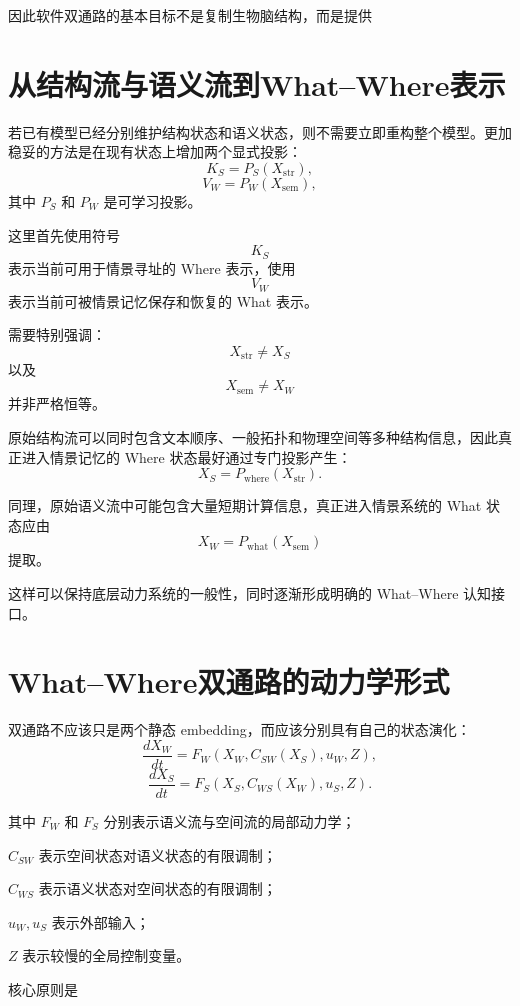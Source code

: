 因此软件双通路的基本目标不是复制生物脑结构，而是提供
\begin{statementbox}
\centering
{}
\end{statementbox}

\section{从结构流与语义流到What--Where表示}

若已有模型已经分别维护结构状态和语义状态，则不需要立即重构整个模型。更加稳妥的方法是在现有状态上增加两个显式投影：
\[
K_S
=
P_S(X_{\mathrm{str}}),
\]
\[
V_W
=
P_W(X_{\mathrm{sem}}),
\]
其中 $P_S$ 和 $P_W$ 是可学习投影。

这里首先使用符号
\[
K_S
\]
表示当前可用于情景寻址的 Where 表示，使用
\[
V_W
\]
表示当前可被情景记忆保存和恢复的 What 表示。

需要特别强调：
\[
\boxed{
X_{\mathrm{str}}
\neq
X_S
}
\]
以及
\[
\boxed{
X_{\mathrm{sem}}
\neq
X_W
}
\]
并非严格恒等。

原始结构流可以同时包含文本顺序、一般拓扑和物理空间等多种结构信息，因此真正进入情景记忆的 Where 状态最好通过专门投影产生：
\[
X_S
=
P_{\mathrm{where}}(X_{\mathrm{str}}).
\]

同理，原始语义流中可能包含大量短期计算信息，真正进入情景系统的 What 状态应由
\[
X_W
=
P_{\mathrm{what}}(X_{\mathrm{sem}})
\]
提取。

这样可以保持底层动力系统的一般性，同时逐渐形成明确的 What--Where 认知接口。

\section{What--Where双通路的动力学形式}

双通路不应该只是两个静态 embedding，而应该分别具有自己的状态演化：
\[
\frac{dX_W}{dt}
=
F_W
\left(
X_W,
C_{SW}(X_S),
u_W,
Z
\right),
\]
\[
\frac{dX_S}{dt}
=
F_S
\left(
X_S,
C_{WS}(X_W),
u_S,
Z
\right).
\]

其中 $F_W$ 和 $F_S$ 分别表示语义流与空间流的局部动力学；

$C_{SW}$ 表示空间状态对语义状态的有限调制；

$C_{WS}$ 表示语义状态对空间状态的有限调制；

$u_W,u_S$ 表示外部输入；

$Z$ 表示较慢的全局控制变量。

核心原则是
\begin{statementbox}
\centering
{}
\end{statementbox}


